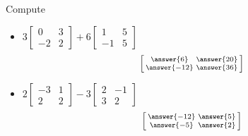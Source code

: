\documentclass{ximera}
\begin{document}
\begin{exercise}
    Compute
    \begin{itemize}
        \item
        $3\begin{bmatrix}
            0 & 3 \\
            -2 & 2
        \end{bmatrix}
        + 6
        \begin{bmatrix}
            1 & 5 \\
            -1 & 5
        \end{bmatrix}$
        \[
            \left[\begin{smallmatrix} \answer{6} & \answer{20} \\ \answer{-12} & \answer{36} \end{smallmatrix}\right]
        \]
        \item
        $2\begin{bmatrix}
            -3 & 1 \\
            2 & 2
        \end{bmatrix}
        - 3
        \begin{bmatrix}
            2 & -1 \\
            3 & 2
        \end{bmatrix}$
        \[
            \left[\begin{smallmatrix} \answer{-12} & \answer{5} \\ \answer{-5} & \answer{2} \end{smallmatrix}\right]
        \]
    \end{itemize}
\end{exercise}
\end{document}
